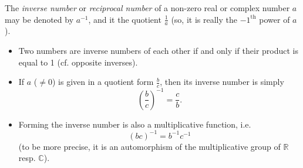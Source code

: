 \documentclass[12pt]{article}
\begin{document}
The {\em inverse number} or {\em reciprocal number} of a non-zero real or complex number $a$ may be denoted by $a^{-1}$, and it  the quotient $\frac{1}{a}$ (so, it is really the $-1^\mathrm{th}$ power of $a$). 

\begin{itemize}
 \item Two numbers are inverse numbers of each other if and only if their product is equal to 1 (cf. opposite inverses).
 \item If $a$ ($\neq 0$) is given in a quotient form $\frac{b}{c}$, then its inverse number is simply
             $$\left(\frac{b}{c}\right)^{-1} = \frac{c}{b}.$$
 \item Forming the inverse number is also a multiplicative function, i.e.
         $$(bc)^{-1} = b^{-1}c^{-1}$$
(to be more precise, it is an automorphism of the multiplicative group of $\mathbb{R}$ resp. $\mathbb{C}$).
\end{itemize}
\end{document}

